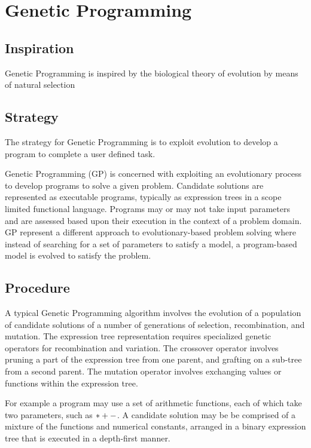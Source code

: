 \section{Genetic Programming}

\subsection{Inspiration}
Genetic Programming is inspired by the biological theory of evolution by means of natural selection

\subsection{Strategy}
The strategy for Genetic Programming is to exploit evolution to develop a program to complete a user defined task.

Genetic Programming (GP) is concerned with exploiting an evolutionary process to develop programs to solve a given problem. Candidate solutions are represented as executable programs, typically as expression trees in a scope limited functional language. Programs may or may not take input parameters and are assessed based upon their execution in the context of a problem domain. GP represent a different approach to evolutionary-based problem solving where instead of searching for a set of parameters to satisfy a model, a program-based model is evolved to satisfy the problem.

\subsection{Procedure}
A typical Genetic Programming algorithm involves the evolution of a population of candidate solutions of a number of generations of selection, recombination, and mutation. The expression tree representation requires specialized genetic operators for recombination and variation. The crossover operator involves pruning a part of the expression tree from one parent, and grafting on a sub-tree from a second parent. The mutation operator involves exchanging values or functions within the expression tree.

For example a program may use a set of arithmetic functions, each of which take two parameters, such as $*\\+-$. A candidate solution may be be comprised of a mixture of the functions and numerical constants, arranged in a binary expression tree that is executed in a depth-first manner. 

